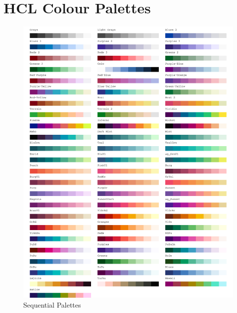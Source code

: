 \chapter{HCL Colour Palettes}
\label{sec:AppendixPalettes}

\newpage


\begin{figure}[h!]
\centering
\includegraphics[width = \textwidth]{graphics/appFigs/hcl_pals_seq.pdf}
\caption{Sequential Palettes}
\end{figure}

\clearpage


